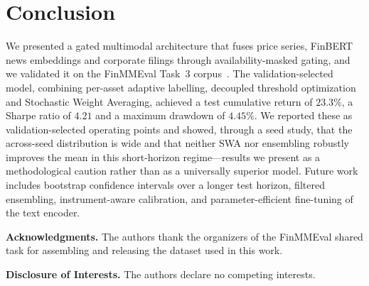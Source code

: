 \documentclass[runningheads]{llncs}
\begin{document}
\section{Conclusion}
We presented a gated multimodal architecture that fuses price series, FinBERT
news embeddings and corporate filings through availability-masked gating, and we
validated it on the FinMMEval Task~3 corpus~\cite{qian2025agents}. The validation-selected model,
combining per-asset adaptive labelling, decoupled threshold optimization and
Stochastic Weight Averaging, achieved a test cumulative return of $23.3\%$, a
Sharpe ratio of $4.21$ and a maximum drawdown of $4.45\%$. We reported these as
validation-selected operating points and showed, through a seed study, that the
across-seed distribution is wide and that neither SWA nor ensembling robustly
improves the mean in this short-horizon regime---results we present as a
methodological caution rather than as a universally superior model. Future work
includes bootstrap confidence intervals over a longer test horizon, filtered
ensembling, instrument-aware calibration, and parameter-efficient fine-tuning of
the text encoder.

\begin{credits}
\noindent\textbf{Acknowledgments.} The authors thank the organizers of the
FinMMEval shared task for assembling and releasing the dataset used in this work.

\noindent\textbf{Disclosure of Interests.} The authors declare no competing
interests.
\end{credits}



\end{document}
